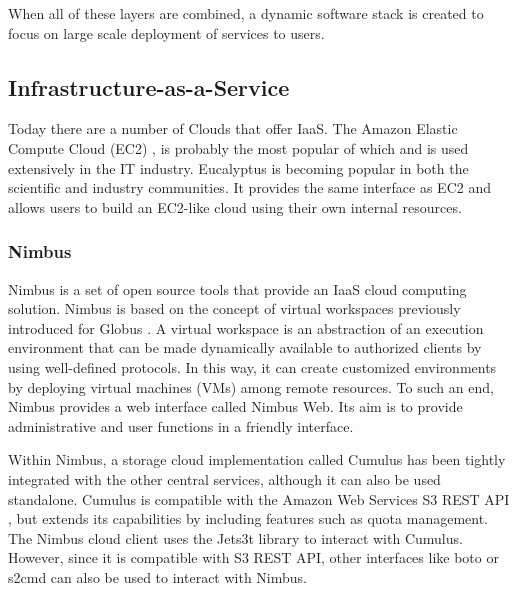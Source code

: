 When all of these layers are combined, a dynamic software stack is created to focus on large scale deployment of services to users.



\subsection{Infrastructure-as-a-Service}



Today there are a number of Clouds that offer IaaS. The Amazon Elastic Compute Cloud (EC2) \cite{www-amazon-ec2}, is probably the most popular of which and is used extensively in the IT industry. Eucalyptus \cite{nurmi2008eos} is becoming popular in both the scientific and industry communities.  It provides the same interface as EC2 and allows users to build an EC2-like cloud using their own internal resources.



\subsubsection{Nimbus}

Nimbus \cite{www/nimbus,virtualwork} is a set of open source tools that provide an IaaS cloud computing solution. Nimbus is based on the concept of virtual workspaces previously introduced for Globus \cite{virtualwork}. A virtual workspace is an abstraction of an execution environment that can be made dynamically available to authorized clients by using well-defined protocols.  In this way, it can create customized environments by deploying virtual machines (VMs) among remote resources. To such an end, Nimbus provides a web interface called Nimbus Web. Its aim is to provide administrative and user functions in a friendly interface. 

\begin{comment}
\FIGURE{!htb}
  {images/nimbusfig.pdf}
  {1.0}
  {Nimus Infrastructure}
  {F:nimbus}
\end{comment}

Within Nimbus, a storage cloud implementation called Cumulus \cite{www/nimbus} has been tightly integrated with the other central services, although it can also be used standalone. Cumulus is compatible with the Amazon Web Services S3 REST API \cite{www/amazons3rest}, but extends its capabilities by including features such as quota management. The Nimbus cloud client uses the Jets3t library \cite{www/jets3t} to interact with Cumulus. However, since it is compatible with S3 REST API, other interfaces like boto \cite{www/boto} or s2cmd \cite{www/s3tools} can also be used to interact with Nimbus.

